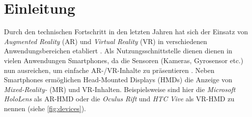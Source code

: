 \chapter{Einleitung}
\label{chap:einleitung}

Durch den technischen Fortschritt in den letzten Jahren hat sich der Einsatz von \emph{Augmented Reality} (AR) und \emph{Virtual Reality} (VR) in verschiedenen Anwendungsbereichen etabliert \parencites[1]{Krevelen2010}{Zhao2009}[58]{Sharples2008}[1]{Jung2008}.
Als Nutzungsschnittstelle dienen dienen in vielen Anwendungen Smartphones, da die Sensoren (Kameras, Gyrosensor etc.) nun ausreichen, um einfache AR-/VR-Inhalte zu präsentieren \parencites{Li2017b}{Feng2017}{Yoo2015}{Mulloni2012}.
Neben Smartphones ermöglichen Head-Mounted Displays (HMDs) die Anzeige von \emph{Mixed-Reality-} (MR) und VR-Inhalten.
Beispielsweise sind hier die \emph{Microsoft HoloLens} \parencite{Microsoft2018} als AR-HMD oder die \emph{Oculus Rift} \parencite{Facebook2018} und \emph{HTC Vive} \parencite{HTCCorporation2018} als VR-HMD zu nennen (siehe \autoref{fig:devices}).

